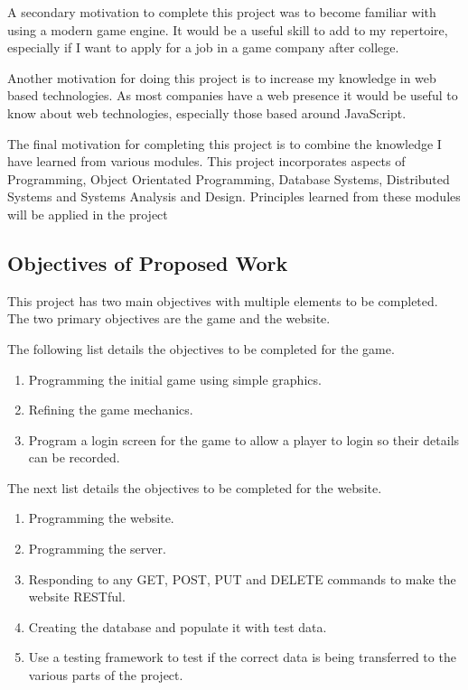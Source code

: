 \documentclass[12pt]{article}
\begin{document}
A secondary motivation to complete this project was to become familiar with using a modern game engine. It would be a useful skill to add to my repertoire, especially if I want to apply for a job in a game company after college. 

Another motivation for doing this project is to increase my knowledge in web based technologies. As most companies have a web presence it would be useful to know about web technologies, especially those based around JavaScript. 

The final motivation for completing this project is to combine the knowledge I have learned from various modules. This project incorporates aspects of Programming, Object Orientated Programming, Database Systems, Distributed Systems and Systems Analysis and Design. Principles learned from these modules will be applied in the project

\begin{center}
\subsection{Objectives of Proposed Work}
\end{center}
This project has two main objectives with multiple elements to be completed. The two primary objectives are the game and the website. 

The following list details the objectives to be completed for the game.

\begin{enumerate}
\item Programming the initial game using simple graphics.
\item Refining the game mechanics.
\item Program a login screen for the game to allow a player to login so their details can
be recorded.
\end{enumerate}

The next list details the objectives to be completed for the website.

\begin{enumerate}
\item Programming the website.
\item Programming the server.
\item Responding to any GET, POST, PUT and DELETE commands to make the
website RESTful.
\item Creating the database and populate it with test data.
\item Use a testing framework to test if the correct data is being transferred to the
various parts of the project.
\end{enumerate}
\newpage
\end{document}
